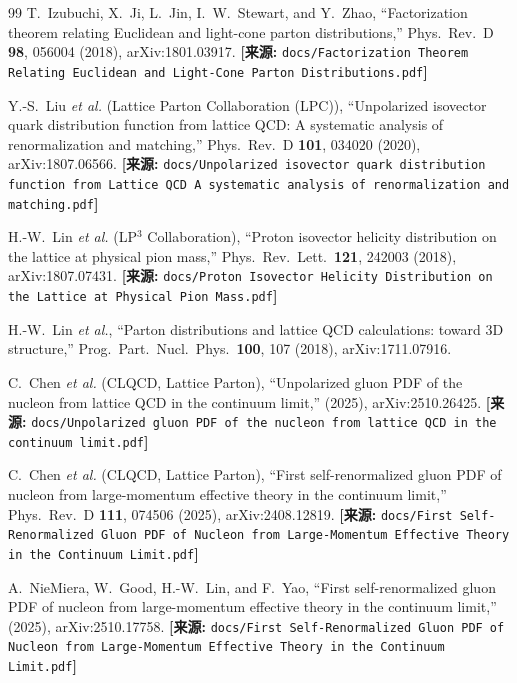 \documentclass[12pt,a4paper]{ctexart}
\theoremstyle{definition}
\begin{document}
\begin{thebibliography}{99}
T.~Izubuchi, X.~Ji, L.~Jin, I.~W.~Stewart, and Y.~Zhao,
``Factorization theorem relating Euclidean and light-cone parton distributions,''
Phys.\ Rev.\ D \textbf{98}, 056004 (2018), arXiv:1801.03917.
\quad\textbf{[来源:} \texttt{docs/Factorization Theorem Relating Euclidean and Light-Cone Parton Distributions.pdf}\textbf{]}

Y.-S.~Liu \textit{et al.} (Lattice Parton Collaboration (LPC)),
``Unpolarized isovector quark distribution function from lattice QCD: A systematic analysis of renormalization and matching,''
Phys.\ Rev.\ D \textbf{101}, 034020 (2020), arXiv:1807.06566.
\quad\textbf{[来源:} \texttt{docs/Unpolarized isovector quark distribution function from Lattice QCD A systematic analysis of renormalization and matching.pdf}\textbf{]}

H.-W.~Lin \textit{et al.} (LP$^3$ Collaboration),
``Proton isovector helicity distribution on the lattice at physical pion mass,''
Phys.\ Rev.\ Lett.\ \textbf{121}, 242003 (2018), arXiv:1807.07431.
\quad\textbf{[来源:} \texttt{docs/Proton Isovector Helicity Distribution on the Lattice at Physical Pion Mass.pdf}\textbf{]}

H.-W.~Lin \textit{et al.},
``Parton distributions and lattice QCD calculations: toward 3D structure,''
Prog.\ Part.\ Nucl.\ Phys.\ \textbf{100}, 107 (2018), arXiv:1711.07916.

C.~Chen \textit{et al.} (CLQCD, Lattice Parton),
``Unpolarized gluon PDF of the nucleon from lattice QCD in the continuum limit,''
(2025), arXiv:2510.26425.
\quad\textbf{[来源:} \texttt{docs/Unpolarized gluon PDF of the nucleon from lattice QCD in the continuum limit.pdf}\textbf{]}

C.~Chen \textit{et al.} (CLQCD, Lattice Parton),
``First self-renormalized gluon PDF of nucleon from large-momentum effective theory in the continuum limit,''
Phys.\ Rev.\ D \textbf{111}, 074506 (2025), arXiv:2408.12819.
\quad\textbf{[来源:} \texttt{docs/First Self-Renormalized Gluon PDF of Nucleon from Large-Momentum Effective Theory in the Continuum Limit.pdf}\textbf{]}

A.~NieMiera, W.~Good, H.-W.~Lin, and F.~Yao,
``First self-renormalized gluon PDF of nucleon from large-momentum effective theory in the continuum limit,''
(2025), arXiv:2510.17758.
\quad\textbf{[来源:} \texttt{docs/First Self-Renormalized Gluon PDF of Nucleon from Large-Momentum Effective Theory in the Continuum Limit.pdf}\textbf{]}


\end{thebibliography}
\end{document}
